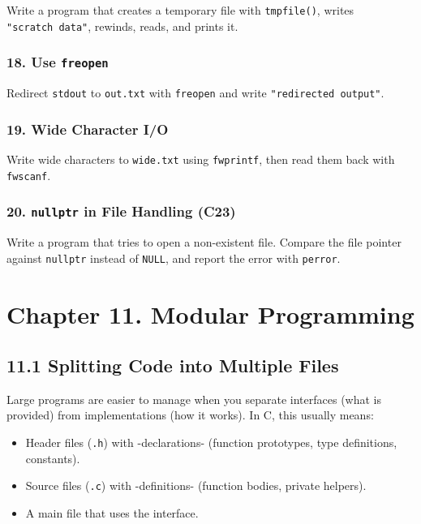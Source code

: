 \documentclass[
  letterpaper,
  DIV=11,
  numbers=noendperiod]{scrreprt}
\providecommand{\tightlist}{%
  \setlength{\itemsep}{0pt}\setlength{\parskip}{0pt}}
\begin{document}
Write a program that creates a temporary file with \texttt{tmpfile()},
writes \texttt{"scratch\ data"}, rewinds, reads, and prints it.

\subsubsection{\texorpdfstring{18. Use
\texttt{freopen}}{18. Use freopen}}\label{use-freopen}

Redirect \texttt{stdout} to \texttt{out.txt} with \texttt{freopen} and
write \texttt{"redirected\ output"}.

\subsubsection{19. Wide Character I/O}\label{wide-character-io}

Write wide characters to \texttt{wide.txt} using \texttt{fwprintf}, then
read them back with \texttt{fwscanf}.

\subsubsection{\texorpdfstring{20. \texttt{nullptr} in File Handling
(C23)}{20. nullptr in File Handling (C23)}}\label{nullptr-in-file-handling-c23}

Write a program that tries to open a non-existent file. Compare the file
pointer against \texttt{nullptr} instead of \texttt{NULL}, and report
the error with \texttt{perror}.

\section{Chapter 11. Modular
Programming}\label{chapter-11.-modular-programming}

\subsection{11.1 Splitting Code into Multiple
Files}\label{splitting-code-into-multiple-files}

Large programs are easier to manage when you separate interfaces (what
is provided) from implementations (how it works). In C, this usually
means:

\begin{itemize}
\tightlist
\item
  Header files (\texttt{.h}) with -declarations- (function prototypes,
  type definitions, constants).
\item
  Source files (\texttt{.c}) with -definitions- (function bodies,
  private helpers).
\item
  A main file that uses the interface.
\end{itemize}
\end{document}
